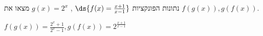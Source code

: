 נתונות הפונקציות
$\ds{f(x)=\frac{x+1}{x-1}}$ ,
$g(x)=2^x$
מצאו את
$f(g(x)),g(f(x))$.
\begin{solbox}
$f(g(x))=\frac{2^x+1}{2^x-1} , g(f(x))=2^{\frac{x+1}{x-1}}$
\end{solbox}
